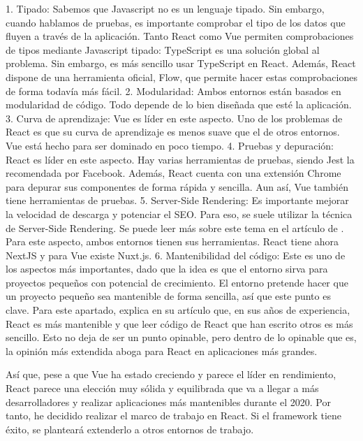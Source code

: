 1. Tipado: Sabemos que Javascript no es un lenguaje tipado. Sin embargo, cuando hablamos de pruebas, es importante comprobar el tipo de los datos que fluyen a través de la aplicación. Tanto React como Vue permiten comprobaciones de tipos mediante Javascript tipado: TypeScript es una solución global al problema. Sin embargo, es más sencillo usar TypeScript en React. Además, React dispone de una herramienta oficial, Flow, que permite hacer estas comprobaciones de forma todavía más fácil.
2. Modularidad: Ambos entornos están basados en modularidad de código. Todo depende de lo bien diseñada que esté la aplicación.
3. Curva de aprendizaje: Vue es líder en este aspecto. Uno de los problemas de React es que su curva de aprendizaje es menos suave que el de otros entornos. Vue está hecho para ser dominado en poco tiempo.
4. Pruebas y depuración: React es líder en este aspecto. Hay varias herramientas de pruebas, siendo Jest la recomendada por Facebook. Además, React cuenta con una extensión Chrome para depurar sus componentes de forma rápida y sencilla. Aun así, Vue también tiene herramientas de pruebas.
5. Server-Side Rendering: Es importante mejorar la velocidad de descarga y potenciar el SEO. Para eso, se suele utilizar la técnica de Server-Side Rendering. Se puede leer más sobre este tema en el artículo de \citet{SSREXP}. Para este aspecto, ambos entornos tienen sus herramientas. React tiene ahora NextJS y para Vue existe Nuxt.js.
6. Mantenibilidad del código: Este es uno de los aspectos más importantes, dado que la idea es que el entorno sirva para proyectos pequeños con potencial de crecimiento. El entorno pretende hacer que un proyecto pequeño sea mantenible de forma sencilla, así que este punto es clave. Para este apartado, \citet{RVVMNTB} explica en su artículo que, en sus años de experiencia, React es más mantenible y que leer código de React que han escrito otros es más sencillo. Esto no deja de ser un punto opinable, pero dentro de lo opinable que es, la opinión más extendida aboga para React en aplicaciones más grandes.

Así que, pese a que Vue ha estado creciendo y parece el líder en rendimiento, React parece una elección muy sólida y equilibrada que va a llegar a más desarrolladores y realizar aplicaciones más mantenibles durante el 2020. Por tanto, he decidido realizar el marco de trabajo en React. Si el framework tiene éxito, se planteará extenderlo a otros entornos de trabajo.

